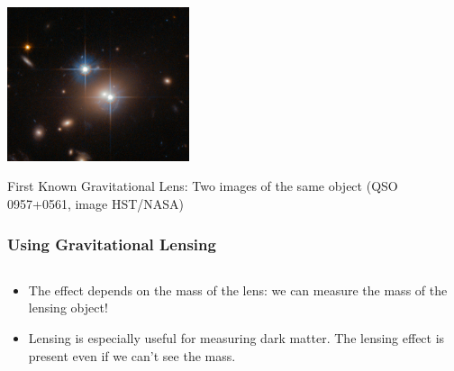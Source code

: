 \documentclass{beamer}
\begin{document}
\frame
{
    \begin{center}
        \includegraphics[width=0.4\textwidth]{QSO_B0957+0561-crop.jpg}
    \end{center}
    {\normalsize First Known Gravitational Lens: Two images of the same 
    object} {\tiny (QSO 0957+0561, image HST/NASA)}
}


\frame
{

    \frametitle{Using Gravitational Lensing}


    \begin{columns}
        \begin{column}{0.5\textwidth}
            \begin{itemize}

                \item The effect depends on the mass of the lens: we can measure the
                    mass of the lensing object!

                \item Lensing is especially useful for measuring dark matter.  The lensing
                    effect is present even if we can't see the mass.


\end{itemize}
\end{column}
\end{columns}}
\end{document}
